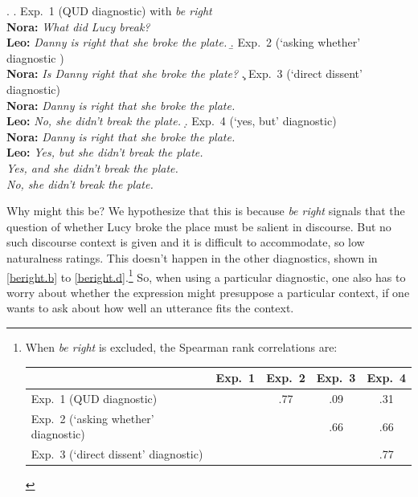 \documentclass[times,linguex,xcolor]{glossa}
\begin{document}
  \ex.
    \a.\label{beright.a}  Exp.~1 (QUD diagnostic) with \emph{be right}
    \\ {\bf Nora:} \emph{What did Lucy break?}
    \\ {\bf Leo:} \emph{Danny is right that she broke the plate.}
    \b.\label{beright.b} Exp.~2 (`asking whether' diagnostic )
    \\ {\bf Nora:} \emph{Is Danny right that she broke the plate?}
    \c.\label{beright.c} Exp.~3 (`direct dissent' diagnostic)
    \\ {\bf Nora:} \emph{Danny is right that she broke the plate.}
    \\ {\bf Leo:} \emph{No, she didn't break the plate.}
    \d.\label{beright.d} Exp.~4 (`yes, but' diagnostic)
    \\ {\bf Nora:} \emph{Danny is right that she broke the plate.}
    \\ {\bf Leo:} \emph{Yes, but she didn't break the plate.}
    \\ \hspace*{1cm} \emph{Yes, and she didn't break the plate.}
    \\ \hspace*{1cm} \emph{No, she didn't break the plate.}

  Why might this be? We hypothesize that this is because \emph{be right} signals that the question of whether Lucy broke the place must be salient in discourse. But no such discourse context is given and it is difficult to accommodate, so low naturalness ratings. This doesn't happen in the other diagnostics, shown in \ref{beright.b} to \ref{beright.d}.\footnote{When \emph{be right} is excluded, the Spearman rank correlations are:
    
   \begin{tabular}{l | c c c c}
   & Exp.~1 & Exp.~2 & Exp.~3 & Exp.~4 \\ \hline
   Exp.~1 (QUD diagnostic) & \cellcolor{lightgray} & .77 & .09 & .31 \\
   Exp.~2 (`asking whether' diagnostic) & \cellcolor{lightgray} & \cellcolor{lightgray} & .66 & .66 \\
   Exp.~3 (`direct dissent' diagnostic) & \cellcolor{lightgray}& \cellcolor{lightgray} & \cellcolor{lightgray} & .77  \\
   \hline
   \end{tabular}} So, when using a particular diagnostic, one also has to worry about whether the expression might presuppose a particular context, if one wants to ask about how well an utterance fits the context.
\end{document}
